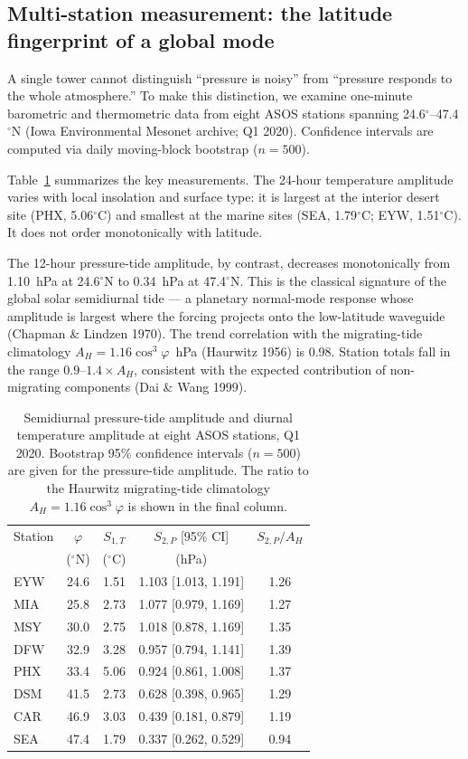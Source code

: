 \documentclass[11pt]{article}
\begin{document}
\subsection{Multi-station measurement: the latitude fingerprint of a global mode}
\label{sec:asos}

A single tower cannot distinguish ``pressure is noisy'' from ``pressure responds
to the whole atmosphere.'' To make this distinction, we examine one-minute
barometric and thermometric data from eight ASOS stations spanning
24.6$^\circ$--47.4$^\circ$N (Iowa Environmental Mesonet archive; Q1 2020).
Confidence intervals are computed via daily moving-block bootstrap ($n = 500$).

Table~\ref{tab:asos} summarizes the key measurements. The 24-hour temperature
amplitude varies with local insolation and surface type: it is largest at the
interior desert site (PHX, 5.06$^\circ$C) and smallest at the marine sites (SEA,
1.79$^\circ$C; EYW, 1.51$^\circ$C). It does not order monotonically with latitude.

The 12-hour pressure-tide amplitude, by contrast, decreases monotonically from
1.10~hPa at 24.6$^\circ$N to 0.34~hPa at 47.4$^\circ$N. This is the classical
signature of the global solar semidiurnal tide --- a planetary normal-mode
response whose amplitude is largest where the forcing projects onto the
low-latitude waveguide (Chapman \& Lindzen 1970). The trend correlation with the
migrating-tide climatology $A_H = 1.16\cos^3\varphi$~hPa (Haurwitz 1956) is 0.98.
Station totals fall in the range $0.9$--$1.4\times A_H$, consistent with the
expected contribution of non-migrating components (Dai \& Wang 1999).

\begin{table}[t]
\centering
\caption{Semidiurnal pressure-tide amplitude and diurnal temperature amplitude at
eight ASOS stations, Q1 2020. Bootstrap 95\% confidence intervals ($n=500$) are
given for the pressure-tide amplitude. The ratio to the Haurwitz migrating-tide
climatology $A_H = 1.16\cos^3\varphi$ is shown in the final column.}
\label{tab:asos}
\begin{tabular}{lcccc}
\toprule
Station & $\varphi$ & $S_{1,T}$ & $S_{2,P}$ [95\% CI] &
$S_{2,P}/A_H$ \\
 & ($^\circ$N) & ($^\circ$C) & (hPa) & \\
\midrule
EYW & 24.6 & 1.51 & 1.103 [1.013, 1.191] & 1.26 \\
MIA & 25.8 & 2.73 & 1.077 [0.979, 1.169] & 1.27 \\
MSY & 30.0 & 2.75 & 1.018 [0.878, 1.169] & 1.35 \\
DFW & 32.9 & 3.28 & 0.957 [0.794, 1.141] & 1.39 \\
PHX & 33.4 & 5.06 & 0.924 [0.861, 1.008] & 1.37 \\
DSM & 41.5 & 2.73 & 0.628 [0.398, 0.965] & 1.29 \\
CAR & 46.9 & 3.03 & 0.439 [0.181, 0.879] & 1.19 \\
SEA & 47.4 & 1.79 & 0.337 [0.262, 0.529] & 0.94 \\
\bottomrule
\end{tabular}
\end{table}
\end{document}

